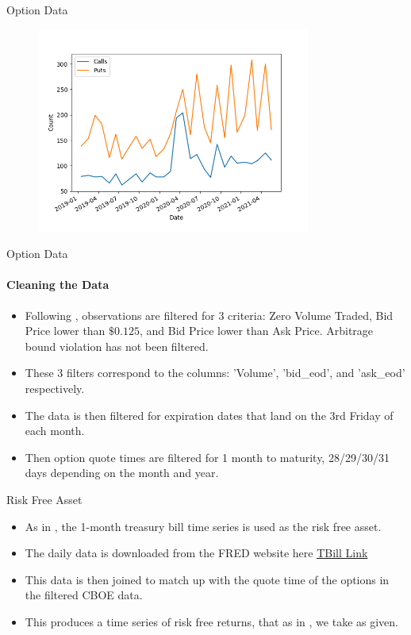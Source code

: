 \documentclass[9pt]{beamer}
\begin{document}
\begin{frame}{Option Data}
\begin{center}
	\begin{figure}
		\includegraphics[width=9cm]{Contract_Count.png}
	\end{figure}
\end{center}
\end{frame}

\begin{frame}{Option Data}
\framesubtitle{Cleaning the Data}
\begin{itemize}
    \item Following \citeauthor{faias2017optimal}, observations are filtered for 3 criteria: Zero Volume Traded, Bid Price lower than $\$0.125$, and Bid Price lower than Ask Price. Arbitrage bound violation has not been filtered.
    \item These 3 filters correspond to the columns: 'Volume', 'bid\_eod', and 'ask\_eod' respectively.
    \item The data is then filtered for expiration dates that land on the 3rd Friday of each month. 
    \item Then option quote times are filtered for 1 month to maturity, 28/29/30/31 days depending on the month and year.
\end{itemize}
\end{frame}

\begin{frame}{Risk Free Asset}
\begin{itemize}
    \item As in \citeauthor{faias2017optimal}, the 1-month treasury bill time series is used as the risk free asset.
    \item The daily data is downloaded from the FRED website here \href{https://fred.stlouisfed.org/series/DGS1MO}{TBill Link}
    \item This data is then joined to match up with the quote time of the options in the filtered CBOE data.
    \item This produces a time series of risk free returns, that as in \citeauthor{faias2017optimal}, we take as given.
\end{itemize}
\end{frame}
\end{document}
